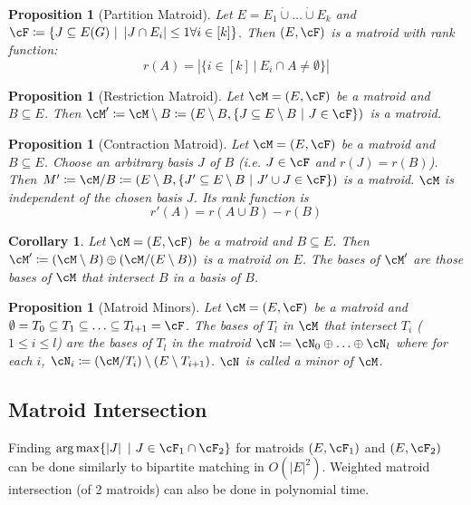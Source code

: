 \documentclass[11pt, a4paper]{article}
\newcommand{\abs}[1]{\left\lvert#1\right\rvert}
\newcommand{\set}[1]{\{#1\}}
\newtheorem{cor}[theorem]{Corollary}
\newtheorem{prop}[theorem]{Proposition}
\theoremstyle{remark}
\theoremstyle{definition}
\begin{document}
\begin{prop}[Partition Matroid]
	Let $E=E_1\dot\cup\ldots\dot\cup E_k$ and $\cF\coloneqq \set{J\subseteq
			E(G)\ |\ \abs{J\cap E_i}\leq 1 \forall i\in [k]}$. Then $(E,\cF)$ is
	a matroid with rank function:
	\[r(A)=\abs{\set{i\in [k]\ |\ E_i\cap A\neq\emptyset}}\]
\end{prop}

\begin{prop}[Restriction Matroid]
	Let $\cM=(E,\cF)$ be a matroid and $B\subseteq E$. Then $\cM'\coloneqq
		\cM\setminus B\coloneqq
		(E\setminus B, \set{J\subseteq E\setminus B\ |\ J\in \cF})$ is a matroid.
\end{prop}

\begin{prop}[Contraction Matroid]
	Let $\cM=(E,\cF)$ be a matroid and $B\subseteq E$. Choose an arbitrary basis
	$J$ of $B$ (i.e. $J\in\cF$ and $r(J)=r(B)$). Then $M'\coloneqq \cM/B\coloneqq
		(E\setminus B, \set{J'\subseteq E\setminus B\ |\ J'\cup J\in \cF})$ is
	a matroid. $\cM$ is independent of the chosen basis $J$. Its rank function
	is
	\[r'(A)=r(A\cup B)-r(B)\]
\end{prop}

\begin{cor}
	Let $\cM=(E,\cF)$ be a matroid and $B\subseteq E$. Then $\cM'\coloneqq
		(\cM\setminus B)\oplus (\cM/ (E\setminus B))$ is a matroid on $E$. The
	bases of $\cM'$ are those bases of $\cM$ that intersect $B$ in a basis
	of $B$.
\end{cor}

\begin{prop}[Matroid Minors]
	Let $\cM=(E,\cF)$ be a matroid and $\emptyset=T_0\subseteq T_1\subseteq
		\ldots\subseteq T_{l+1}=\cF$. The bases of $T_l$ in $\cM$ that intersect
	$T_i$ ($1\leq i\leq l$) are the bases of $T_l$ in the matroid $\cN\coloneqq
		\cN_0\oplus \ldots\oplus \cN_l$ where for each $i$, $\cN_i\coloneqq
		(\cM / T_i)\setminus (E\setminus T_{i+1})$.  $\cN$ is called a minor of $\cM$.
\end{prop}

\subsection{Matroid Intersection}
Finding $\arg\max\set{\abs{J}\ |\ J\in\cF_1\cap \cF_2}$ for matroids
$(E,\cF_1)$ and $(E,\cF_2)$ can be done similarly to bipartite
matching in $O(\abs{E}^2)$. Weighted matroid intersection (of 2
matroids) can also be done in polynomial time.
\end{document}
